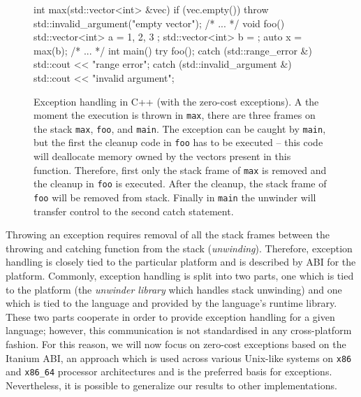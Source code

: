 \begin{figure}[tp]
  \begin{cppcode}
    int max(std::vector<int> &vec) {
      if (vec.empty())
        throw std::invalid_argument("empty vector");
      /* ... */
    }
    void foo() {
      std::vector<int> a = { 1, 2, 3 };
      std::vector<int> b = {};
      auto x = max(b);
      /* ... */
    }
    int main() {
      try {
        foo();
      }
      catch (std::range_error &) {
        std::cout << "range error\n";
      }
      catch (std::invalid_argument &) {
        std::cout << "invalid argument\n";
      }
    }
  \end{cppcode}
\caption{Exception handling in C++ (with the zero-cost exceptions).
  A the moment the execution is thrown in \texttt{max}, there are three frames
  on the stack \texttt{max}, \texttt{foo}, and \texttt{main}.
  The exception can be caught by \texttt{main}, but the first the cleanup code
  in \texttt{foo} has to be executed -- this code will deallocate memory owned
  by the vectors present in this function.
  Therefore, first only the stack frame of \texttt{max} is removed and the
  cleanup in \texttt{foo} is executed.
  After the cleanup, the stack frame of \texttt{foo} will be removed from
  stack.
  Finally in \texttt{main} the unwinder will transfer control to the second
  catch statement.
}\label{fig:lang:exceptcpp}
\end{figure}

Throwing an exception requires removal of all the stack frames
between the throwing and catching function from the stack (\emph{unwinding}).
Therefore, exception handling is closely tied to the particular platform and is
described by ABI for the platform.
Commonly, exception handling is split into two parts, one which is tied to the
platform (the \emph{unwinder library} which handles stack unwinding) and one
which is tied to the language and provided by the language's runtime
library.
These two parts cooperate in order to provide exception handling for a
given language; however, this communication is not standardised in any
cross-platform fashion.
For this reason, we will now focus on zero-cost exceptions based on the Itanium
ABI, an approach which is used across various Unix-like systems on \texttt{x86}
and \texttt{x86\_64} processor architectures and is the preferred basis for
\llvm{} exceptions.
Nevertheless, it is possible to generalize our results to other
implementations.

